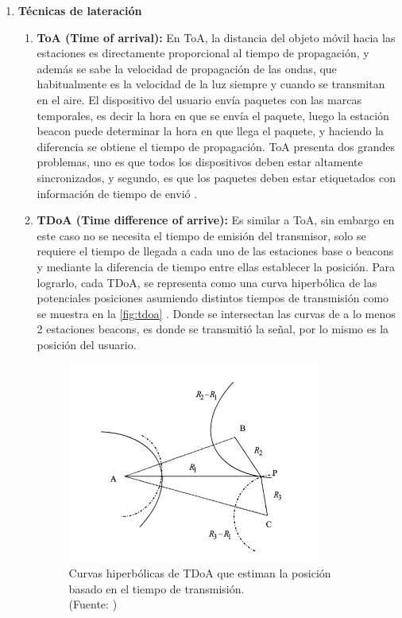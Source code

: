 \begin{enumerate}
\item \textbf{Técnicas de lateración }
\begin{enumerate}
\item \textbf{ToA (Time of arrival):} En ToA, la distancia del objeto móvil hacia las estaciones es directamente proporcional al tiempo de propagación, y además se sabe la velocidad de propagación de las ondas, que habitualmente es la velocidad de la luz siempre y cuando se transmitan en el aire. El dispositivo del usuario envía paquetes con las marcas temporales, es decir la hora en que se envía el paquete, luego la estación beacon puede determinar la hora en que llega el paquete, y haciendo la diferencia se obtiene el tiempo de propagación. ToA presenta dos grandes problemas, uno es que todos los dispositivos deben estar altamente sincronizados, y segundo, es que los paquetes deben estar etiquetados con información de tiempo de envió \citep{102710}.

\item \textbf{TDoA (Time difference of arrive):} Es similar a ToA, sin embargo en este caso no se necesita el tiempo de emisión del transmisor, solo se requiere el tiempo de llegada a cada uno de las estaciones base o beacons y mediante la diferencia de tiempo entre ellas establecer la posición. Para lograrlo, cada TDoA, se representa como una curva hiperbólica de las potenciales posiciones asumiendo distintos tiempos de transmisión como se muestra en la \autoref{fig:tdoa} . Donde se intersectan las curvas de a lo menos 2 estaciones beacons, es donde se transmitió la señal, por lo mismo es la posición del usuario.

\begin{figure}[ht!]
\centering
\includegraphics[width=.6\textwidth]{figures/tdoa.png}
\caption[Curvas Hiperbólicas TDoA]{Curvas hiperbólicas de TDoA que estiman la posición basado en el tiempo de transmisión.\\
{\scriptsize (Fuente: \citep{Liu:2007:SWI:2220431.2221077})}}
\label{fig:tdoa}
\end{figure}


\end{enumerate}
\end{enumerate}
